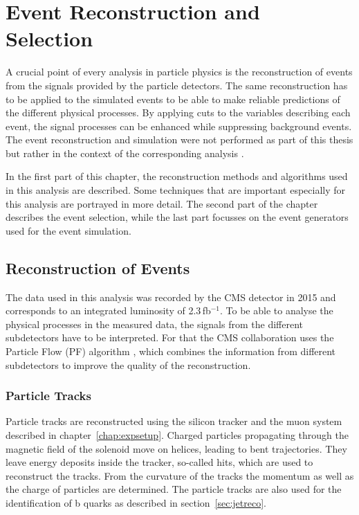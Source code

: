 \chapter{Event Reconstruction and Selection}
\label{chap::EventReconstructionandSelection}
A crucial point of every analysis in particle physics is the reconstruction of events from the signals provided by the particle detectors. The same reconstruction has to be applied to the simulated events to be able to make reliable predictions of the different physical processes. By applying cuts to the variables describing each event, the signal processes can be enhanced while suppressing background events. The event reconstruction and simulation were not performed as part of this thesis but rather in the context of the corresponding analysis \cite{PAS}.

\noindent In the first part of this chapter, the reconstruction methods and algorithms used in this analysis are described. Some techniques that are important especially for this analysis are portrayed in more detail. The second part of the chapter describes the event selection, while the last part focusses on the event generators used for the event simulation. 
\section{Reconstruction of Events}
The data used in this analysis was recorded by the CMS detector in 2015 and corresponds to an integrated luminosity of 2.3\,fb$^{-1}$. To be able to analyse the physical processes in the measured data, the signals from the different subdetectors have to be interpreted. For that the CMS collaboration uses the Particle Flow (PF) algorithm \cite{PF1,PF2}, which combines the information from different subdetectors to improve the quality of the reconstruction.
\subsection{Particle Tracks}
\label{sec:trackreco}
Particle tracks are reconstructed using the silicon tracker and the muon system described in chapter~\ref{chap:expsetup}. Charged particles propagating through the magnetic field of the solenoid move on helices, leading to bent trajectories. They leave energy deposits inside the tracker, so-called hits, which are used to reconstruct the tracks. From the curvature of the tracks the momentum as well as the charge of particles are determined. The particle tracks are also used for the identification of b quarks as described in section~\ref{sec:jetreco}.\\

